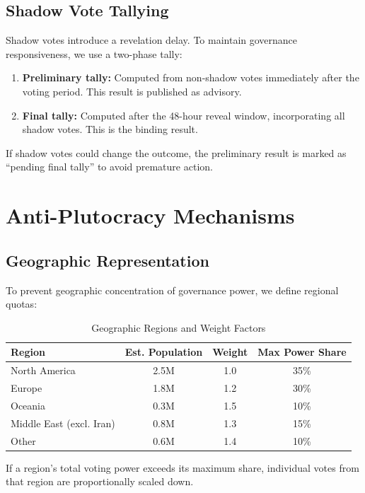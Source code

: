 \documentclass[11pt,a4paper]{article}
\begin{document}
\subsection{Shadow Vote Tallying}

Shadow votes introduce a revelation delay. To maintain governance responsiveness, we use a two-phase tally:

\begin{enumerate}
    \item \textbf{Preliminary tally:} Computed from non-shadow votes immediately after the voting period. This result is published as advisory.
    \item \textbf{Final tally:} Computed after the 48-hour reveal window, incorporating all shadow votes. This is the binding result.
\end{enumerate}

If shadow votes could change the outcome, the preliminary result is marked as ``pending final tally'' to avoid premature action.

\section{Anti-Plutocracy Mechanisms}
\label{sec:geo}

\subsection{Geographic Representation}

To prevent geographic concentration of governance power, we define regional quotas:

\begin{table}[H]
\centering
\caption{Geographic Regions and Weight Factors}
\label{tab:geo}
\begin{tabular}{lccc}
\toprule
\textbf{Region} & \textbf{Est. Population} & \textbf{Weight} & \textbf{Max Power Share} \\
\midrule
North America & 2.5M & 1.0 & 35\% \\
Europe & 1.8M & 1.2 & 30\% \\
Oceania & 0.3M & 1.5 & 10\% \\
Middle East (excl. Iran) & 0.8M & 1.3 & 15\% \\
Other & 0.6M & 1.4 & 10\% \\
\bottomrule
\end{tabular}
\end{table}

If a region's total voting power exceeds its maximum share, individual votes from that region are proportionally scaled down.
\end{document}
